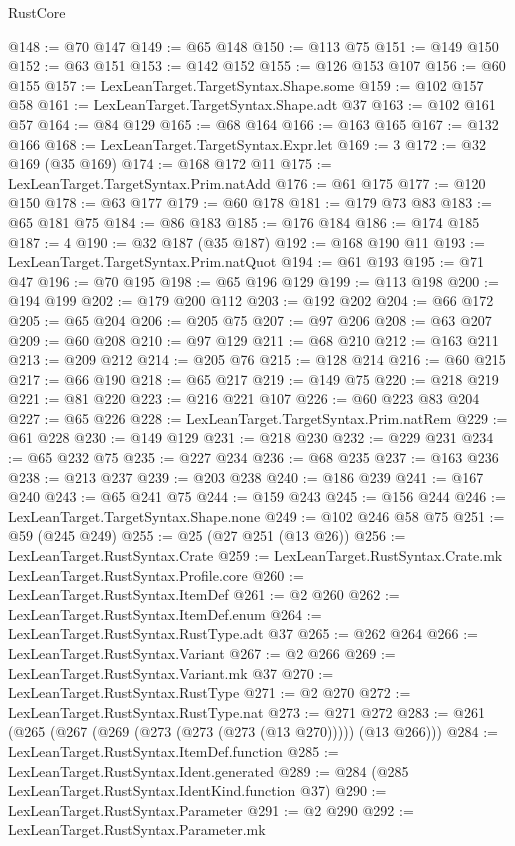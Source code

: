 \begin{lexlean}{RustCore}
\begin{coremodule}
@148 := @70 @147
@149 := @65 @148
@150 := @113 @75
@151 := @149 @150
@152 := @63 @151
@153 := @142 @152
@155 := @126 @153 @107
@156 := @60 @155
@157 := LexLeanTarget.TargetSyntax.Shape.some
@159 := @102 @157 @58
@161 := LexLeanTarget.TargetSyntax.Shape.adt @37
@163 := @102 @161 @57
@164 := @84 @129
@165 := @68 @164
@166 := @163 @165
@167 := @132 @166
@168 := LexLeanTarget.TargetSyntax.Expr.let
@169 := 3
@172 := @32 @169 (@35 @169)
@174 := @168 @172 @11
@175 := LexLeanTarget.TargetSyntax.Prim.natAdd
@176 := @61 @175
@177 := @120 @150
@178 := @63 @177
@179 := @60 @178
@181 := @179 @73 @83
@183 := @65 @181 @75
@184 := @86 @183
@185 := @176 @184
@186 := @174 @185
@187 := 4
@190 := @32 @187 (@35 @187)
@192 := @168 @190 @11
@193 := LexLeanTarget.TargetSyntax.Prim.natQuot
@194 := @61 @193
@195 := @71 @47
@196 := @70 @195
@198 := @65 @196 @129
@199 := @113 @198
@200 := @194 @199
@202 := @179 @200 @112
@203 := @192 @202
@204 := @66 @172
@205 := @65 @204
@206 := @205 @75
@207 := @97 @206
@208 := @63 @207
@209 := @60 @208
@210 := @97 @129
@211 := @68 @210
@212 := @163 @211
@213 := @209 @212
@214 := @205 @76
@215 := @128 @214
@216 := @60 @215
@217 := @66 @190
@218 := @65 @217
@219 := @149 @75
@220 := @218 @219
@221 := @81 @220
@223 := @216 @221 @107
@226 := @60 @223 @83 @204
@227 := @65 @226
@228 := LexLeanTarget.TargetSyntax.Prim.natRem
@229 := @61 @228
@230 := @149 @129
@231 := @218 @230
@232 := @229 @231
@234 := @65 @232 @75
@235 := @227 @234
@236 := @68 @235
@237 := @163 @236
@238 := @213 @237
@239 := @203 @238
@240 := @186 @239
@241 := @167 @240
@243 := @65 @241 @75
@244 := @159 @243
@245 := @156 @244
@246 := LexLeanTarget.TargetSyntax.Shape.none
@249 := @102 @246 @58 @75
@251 := @59 (@245 @249)
@255 := @25 (@27 @251 (@13 @26))
@256 := LexLeanTarget.RustSyntax.Crate
@259 := LexLeanTarget.RustSyntax.Crate.mk LexLeanTarget.RustSyntax.Profile.core
@260 := LexLeanTarget.RustSyntax.ItemDef
@261 := @2 @260
@262 := LexLeanTarget.RustSyntax.ItemDef.enum
@264 := LexLeanTarget.RustSyntax.RustType.adt @37
@265 := @262 @264
@266 := LexLeanTarget.RustSyntax.Variant
@267 := @2 @266
@269 := LexLeanTarget.RustSyntax.Variant.mk @37
@270 := LexLeanTarget.RustSyntax.RustType
@271 := @2 @270
@272 := LexLeanTarget.RustSyntax.RustType.nat
@273 := @271 @272
@283 := @261 (@265 (@267 (@269 (@273 (@273 (@273 (@13 @270))))) (@13 @266)))
@284 := LexLeanTarget.RustSyntax.ItemDef.function
@285 := LexLeanTarget.RustSyntax.Ident.generated
@289 := @284 (@285 LexLeanTarget.RustSyntax.IdentKind.function @37)
@290 := LexLeanTarget.RustSyntax.Parameter
@291 := @2 @290
@292 := LexLeanTarget.RustSyntax.Parameter.mk

\end{coremodule}
\end{lexlean}

